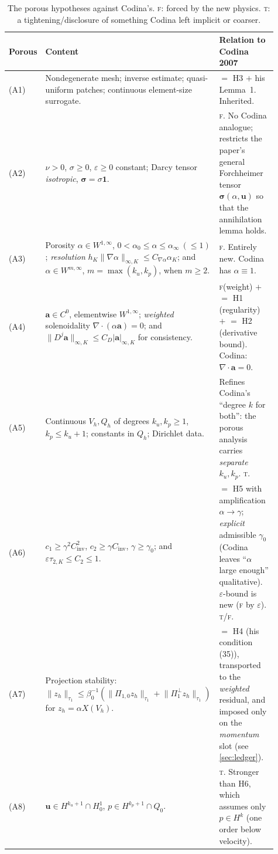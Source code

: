 \documentclass[11pt]{article}
\theoremstyle{remark}
\newcommand{\bu}{\boldsymbol{u}}
\newcommand{\ba}{\boldsymbol{a}}
\newcommand{\norm}[1]{\lVert #1 \rVert}
\newcommand{\Poneo}{\Pi_{1}^{\perp}}
\newcommand{\forced}{\textsc{f}\xspace}   %
\newcommand{\tight}{\textsc{t}\xspace}    %
\begin{document}
\begin{table}[htbp]
\centering
\small
\renewcommand{\arraystretch}{1.3}
\begin{tabular}{@{}p{0.09\linewidth}p{0.40\linewidth}p{0.42\linewidth}@{}}
\toprule
Porous & Content & Relation to Codina 2007 \\
\midrule
(A1) & Nondegenerate mesh; inverse estimate; quasi-uniform patches; continuous element-size surrogate.
 & $=$ H3 $+$ his Lemma~1. Inherited. \\
(A2) & $\nu>0$, $\sigma\ge0$, $\varepsilon\ge0$ constant; Darcy tensor \emph{isotropic}, $\boldsymbol\sigma=\sigma\boldsymbol1$.
 & \forced. No Codina analogue; restricts the paper's general Forchheimer tensor $\boldsymbol\sigma(\alpha,\bu)$ so that the annihilation lemma holds. \\
(A3) & Porosity $\alpha\in W^{1,\infty}$, $0<\alpha_0\le\alpha\le\alpha_\infty\ (\le1)$; \emph{resolution} $h_K\norm{\nabla\alpha}_{\infty,K}\le C_{\nabla\alpha}\alpha_K$; and $\alpha\in W^{m,\infty}$, $m=\max(k_u,k_p)$, when $m\ge2$.
 & \forced. Entirely new. Codina has $\alpha\equiv1$. \\
(A4) & $\ba\in C^0$, elementwise $W^{1,\infty}$; \emph{weighted} solenoidality $\nabla\cdot(\alpha\ba)=0$; and $\norm{D^j\ba}_{\infty,K}\le C_D|\ba|_{\infty,K}$ for consistency.
 & \forced (weight) $+$ $=$ H1 (regularity) $+$ $=$ H2 (derivative bound). Codina: $\nabla\cdot\ba=0$. \\
(A5) & Continuous $V_h,Q_h$ of degrees $k_u,k_p\ge1$, $k_p\le k_u+1$; constants in $Q_h$; Dirichlet data.
 & Refines Codina's ``degree $k$ for both'': the porous analysis carries \emph{separate} $k_u,k_p$. \tight. \\
(A6) & $c_1\ge\gamma^2C_{\mathrm{inv}}^2$, $c_2\ge\gamma C_{\mathrm{inv}}$, $\gamma\ge\gamma_0$; and $\varepsilon\tau_{2,K}\le C_2\le1$.
 & $=$ H5 with amplification $\alpha\to\gamma$; \emph{explicit} admissible $\gamma_0$ (Codina leaves ``$\alpha$ large enough'' qualitative). $\varepsilon$-bound is new (\forced by $\varepsilon$). \tight/\forced. \\
(A7) & Projection stability: $\norm{z_h}_{\tau_1}\le\beta_0^{-1}(\norm{\Pi_{1,0}z_h}_{\tau_1}+\norm{\Poneo z_h}_{\tau_1})$ for $z_h=\alpha X(V_h)$.
 & $=$ H4 (his condition (35)), transported to the \emph{weighted} residual, and imposed only on the \emph{momentum} slot (see \cref{sec:ledger}). \\
(A8) & $\bu\in H^{k_u+1}\cap H^1_0$, $p\in H^{k_p+1}\cap Q_0$.
 & \tight. Stronger than H6, which assumes only $p\in H^{k}$ (one order below velocity). \\
\bottomrule
\end{tabular}
\caption{The porous hypotheses against Codina's. \forced{}: forced by the new physics.
\tight{}: a tightening/disclosure of something Codina left implicit or coarser.}
\label{tab:assumptions}
\end{table}
\end{document}
